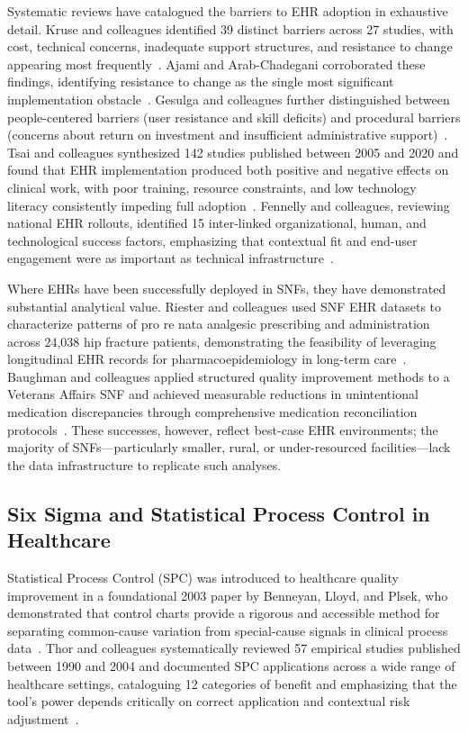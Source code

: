 \documentclass[letterpaper, 10pt, conference]{IEEEconf}
\begin{document}
Systematic reviews have catalogued the barriers to EHR adoption in exhaustive
detail.
Kruse and colleagues identified 39 distinct barriers across 27 studies, with
cost, technical concerns, inadequate support structures, and resistance to
change appearing most
frequently~\cite{Kruse2016Barriers,Kruse2016Adoption}.
Ajami and Arab-Chadegani corroborated these findings, identifying resistance
to change as the single most significant implementation
obstacle~\cite{Ajami2013Barriers}.
Gesulga and colleagues further distinguished between people-centered barriers
(user resistance and skill deficits) and procedural barriers (concerns about
return on investment and insufficient administrative
support)~\cite{Gesulga2017Barriers}.
Tsai and colleagues synthesized 142 studies published between 2005 and 2020 and
found that EHR implementation produced both positive and negative effects on
clinical work, with poor training, resource constraints, and low technology
literacy consistently impeding full
adoption~\cite{Tsai2020Effects}.
Fennelly and colleagues, reviewing national EHR rollouts, identified 15
inter-linked organizational, human, and technological success factors,
emphasizing that contextual fit and end-user engagement were as important as
technical infrastructure~\cite{Fennelly2020Successfully}.

Where EHRs have been successfully deployed in SNFs, they have demonstrated
substantial analytical value.
Riester and colleagues used SNF EHR datasets to characterize patterns of
pro re nata analgesic prescribing and administration across 24,038 hip fracture
patients, demonstrating the feasibility of leveraging longitudinal EHR records
for pharmacoepidemiology in long-term care~\cite{Riester2024Use}.
Baughman and colleagues applied structured quality improvement methods to a
Veterans Affairs SNF and achieved measurable reductions in unintentional
medication discrepancies through comprehensive medication reconciliation
protocols~\cite{Baughman2021Improving}.
These successes, however, reflect best-case EHR environments; the majority of
SNFs---particularly smaller, rural, or under-resourced facilities---lack the
data infrastructure to replicate such analyses.

\subsection{Six Sigma and Statistical Process Control in Healthcare}

Statistical Process Control (SPC) was introduced to healthcare quality
improvement in a foundational 2003 paper by Benneyan, Lloyd, and Plsek, who
demonstrated that control charts provide a rigorous and accessible method for
separating common-cause variation from special-cause signals in clinical process
data~\cite{Benneyan2003Statistical}.
Thor and colleagues systematically reviewed 57 empirical studies published
between 1990 and 2004 and documented SPC applications across a wide range of
healthcare settings, cataloguing 12 categories of benefit and emphasizing
that the tool's power depends critically on correct application and contextual
risk adjustment~\cite{Thor2007Application}.
\end{document}

